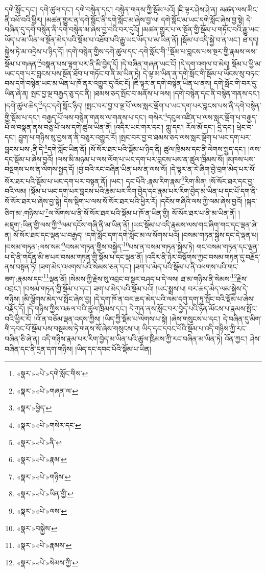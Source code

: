 དགེ་སློང་དང་། དགེ་ཚུལ་དང་། དགེ་བསྙེན་དང་། བསྙེན་གནས་ཀྱི་སྡོམ་པའོ། །ཇི་ལྟར་ཤེས་ཤེ་ན། མཚན་ལས་མིང་ནི་འཕོ་བའི་ཕྱིར། །མཚན་གྱུར་ན་དགེ་སློང་ནི་དགེ་སློང་མ་ཞེས་བྱ་ལ། དགེ་སློང་མ་ཡང་དགེ་སློང་ཞེས་བྱ་སྟེ། དེ་བཞིན་དུ་དགེ་བསྙེན་ནི་དགེ་བསྙེན་མ་ཞེས་བྱ་བའི་བར་དུའོ། །མཚན་གྱུར་པ་ལ་སྔོན་གྱི་སྡོམ་པ་གཏོང་བའི་རྒྱུ་ཡང་ཡོད་པ་མ་ཡིན་ལ་སྔོན་མེད་པའི་སྡོམ་པ་འཐོབ་པའི་རྒྱུ་ཡང་ཡོད་པ་མ་ཡིན་ནོ། །སྡོམ་པ་འདི་སྐྱེ་བ་ན་ཡང་། ཐ་དད། སྐྱེས་ཏེ་མ་འདྲེས་པ་ཉིད་དོ། །དགེ་བསྙེན་གྱིས་དགེ་ཚུལ་དང་:དགེ་སློང་གི་\footnote{«སྣར་»«པེ་»དགེ་སློང་གིས་}སྡོམ་པ་བླངས་པས་སྔར་གྱི་རྣམས་ལས་སྡོམ་པ་གཞན་\footnote{«སྣར་»«པེ་»གཞན་ལ་}བསྣན་པས་ལྷག་པར་ནི་མི་བྱེད་དོ། །དེ་བཞིན་གཞན་ཡང་ངོ། །དེ་དག་འགལ་བ་མེད། སྡོམ་པ་ཕྱི་མ་ཡང་དག་པར་བླངས་པས་སྔོན་ཐོབ་པ་གཏོང་བ་ནི་མ་ཡིན་ཏེ། དེ་ལྟ་མ་ཡིན་ན་དགེ་སློང་གི་སྡོམ་པ་ཡོངས་སུ་བཏང་བས་དགེ་བསྙེན་ཡང་མ་ཡིན་པ་ཁོ་ནར་འགྱུར་དུ་འོང་ངོ། །ཇི་ལྟར་ན་དགེ་བསྙེན་ཡིན་པ་ནས། དགེ་སློང་གི་བར་དུ་ཡིན་ཞེ་ན། སྤང་བྱ་ལྔ་བརྒྱད་ཅུ་དང་ནི། །ཐམས་ཅད་སྤོང་བ་མནོས་པ་ལས། །དགེ་བསྙེན་དང་ནི་བསྙེན་གནས་དང་། །དགེ་ཚུལ་ཆེད་\footnote{«སྣར་»ཕྱེད་}དང་དགེ་སློང་ཉིད། །སྤང་བར་བྱ་བ་ལྔ་པོ་ལས་སླར་ལྡོག་པ་ཡང་དག་པར་བླངས་པས་ནི་དགེ་བསྙེན་གྱི་སྡོམ་པ་དང་། བརྒྱད་པོ་ལས་བསྙེན་གནས་ལ་གནས་པ་དང་། གསེར་\footnote{«སྣར་»«པེ་»གསེར་དང་}དངུལ་འཛིན་པ་ལས་སླར་ལྡོག་པ་བརྒྱད་པོ་ལ་བསྣན་ནས་བཅུ་པོ་ལས་དགེ་ཚུལ་ཡིན་ནོ། །འདིར་ཡང་གར་དང་། གླུ་དང་། རོལ་མོ་དང་། དྲི་དང་། ཕྲེང་བ་དང་། བྱུག་པ་གཉིས་སུ་བྱས་ན་ནི་བཅུར་འགྱུར་རོ། །སྤང་བར་བྱ་བ་ཐམས་ཅད་ལས་སླར་ལྡོག་པ་ཡང་དག་པར་བླངས་པས་:ནི་དེ་\footnote{«སྣར་»«པེ་»ནི་}དགེ་སློང་ཡིན་ནོ། །སོ་སོར་ཐར་པའི་སྡོམ་པ་ཉིད་ནི། ཚུལ་ཁྲིམས་དང་ནི་ལེགས་སྤྱད་དང་། །ལས་དང་སྡོམ་པ་ཞེས་བྱའོ། །ལས་མི་མཉམ་པ་ལས་ལོག་པ་ཡང་དག་པར་བླངས་པས་ན་ཚུལ་ཁྲིམས་སོ། །མཁས་པས་བསྔགས་པས་ན་ལེགས་སྤྱད་དོ། །བྱ་བའི་རང་བཞིན་ཡིན་པས་ན་ལས་སོ། །དེ་ལྟར་ན་རེ་ཞིག་བྱེ་བྲག་མེད་པར་སོ་སོར་ཐར་པའི་སྡོམ་པ་ཡང་དག་པར་བསྟན་ནོ། །ཡང་། དང་པོའི་:རྣམ་རིག་རྣམ་\footnote{«སྣར་»«པེ་»རྣམ་}རིག་མིན། །སོ་སོར་ཐར་དང་བྱ་བའི་ལམ། །སྡོམ་པ་ཡང་དག་པར་བླངས་པའི་རྣམ་པར་རིག་བྱེད་དང་རྣམ་པར་རིག་བྱེད་མ་ཡིན་པ་དང་པོ་དག་ནི་སོ་སོར་ཐར་པ་ཞེས་བྱ་སྟེ། དེས་སྡིག་པ་ལས་སོ་སོར་ཐར་པའི་ཕྱིར་རོ། །དངོས་གཞིའི་ལས་ཀྱི་ལམ་ཞེས་བྱའོ། །སྐད་ཅིག་མ་:གཉིས་པ་\footnote{«སྣར་»«པེ་»གཉིས་}ལ་སོགས་པ་ནི་སོ་སོར་ཐར་པའི་སྡོམ་པ་ཁོ་ན་ཡིན་གྱི། སོ་སོར་ཐར་པ་ནི་མ་ཡིན་ནོ། །མཇུག་:ཡིན་གྱི་ལས་ཀྱི་\footnote{«སྣར་»«པེ་»ཡིན་གྱི་}ལམ་དངོས་གཞི་ནི་མ་ཡིན་ནོ། །ཡང་སྡོམ་པ་འདི་རྣམས་ལས་གང་ཞིག་གང་དང་ལྡན་ཞེ་ན། སོ་སོར་ཐར་དང་ལྡན་པ་བརྒྱད། །དགེ་སློང་དག་དགེ་སློང་མ་ལ་སོགས་པའོ། །བསམ་གཏན་སྐྱེས་དང་དེ་ལྡན་པ། །བསམ་གཏན་:ལས་སམ་\footnote{«སྣར་»«པེ་»ལས་}བསམ་གཏན་གྱིས་བསྐྱེད་\footnote{«སྣར་»བསྐྱེས་}པས་ན་བསམ་གཏན་སྐྱེས་ཏེ། གང་བསམ་གཏན་དང་ལྡན་པ་དེ་ནི་གདོན་མི་ཟ་པར་བསམ་གཏན་གྱི་སྡོམ་པ་དང་ལྡན་ནོ། །འདིར་ནི་ཉེར་བསྡོགས་ཀྱང་བསམ་གཏན་དུ་བརྗོད་ནས་བསྟན་ཏོ། །ཟག་མེད་འཕགས་པའི་སེམས་ཅན་དང་། །ཟག་པ་མེད་པའི་སྡོམ་པ་ནི་འཕགས་པའི་གང་ཟག་:རྣམས་དང་\footnote{«སྣར་»«པེ་»རྣམས་}ལྡན་ནོ། །སེམས་ཀྱི་རྗེས་སུ་འབྲང་བ་སྔར་བཤད་པ་དེ་ལས། ཐ་མ་གཉིས་ནི་སེམས་\footnote{«སྣར་»«པེ་»སེམས་ཀྱི་}རྗེས་འབྲང་། །བསམ་གཏན་གྱི་སྡོམ་པ་དང་། ཟག་པ་མེད་པའི་སྡོམ་པའོ། །ཡང་སྨྲས་པ། བར་ཆད་མེད་ལམ་སྐྱེས་དེ་གཉིས། །མི་ལྕོགས་མེད་ལ་སྤོང་ཞེས་བྱ། །དེ་དག་ཁོ་ན་བར་ཆད་མེད་པའི་ལམ་དགུ་དག་ཏུ་སྤོང་བའི་སྡོམ་པ་ཞེས་བརྗོད་དོ། །དེ་གཉིས་ཀྱིས་འཆལ་བའི་ཚུལ་ཁྲིམས་དང་། དེ་ཀུན་ནས་སློང་བར་བྱེད་པའི་ཉོན་མོངས་པ་རྣམས་སྤོང་བའི་ཕྱིར་རོ། །འོ་ན་བཅོམ་ལྡན་འདས་ཀྱིས། །ཡིད་ཀྱི་སྡོམ་པ་ལེགས་པ་སྟེ། །ཞེས་གསུངས་པ་དང་། དེ་བཞིན་དུ་མིག་གི་དབང་པོ་སྡོམ་པས་བསྡམས་ཏེ་གནས་སོ་ཞེས་གསུངས་པ། ཡིད་དང་དབང་པོའི་སྡོམ་པ་འདི་གཉིས་ཀྱི་རང་བཞིན་ཅི་ཞེ་ན། འདི་གཉིས་རྣམ་པར་རིག་བྱེད་མ་ཡིན་པའི་ཚུལ་ཁྲིམས་ཀྱི་རང་བཞིན་མ་ཡིན་ཏེ། འོན་ཀྱང་། ཤེས་བཞིན་དང་ནི་དྲན་དག་གཉིས། །ཡིད་དང་དབང་པོའི་སྡོམ་པ་ཡིན། 